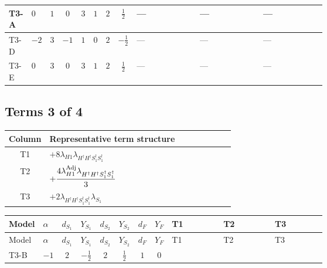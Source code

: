 \documentclass[8pt]{article}
\begin{document}
\begin{landscape}
\begin{longtable}{@{}llcccccc >{\raggedright\arraybackslash}p{0.21\linewidth} >{\raggedright\arraybackslash}p{0.21\linewidth} >{\raggedright\arraybackslash}p{0.21\linewidth}@{}}
\midrule
T3-A & $0$ & $1$ & $0$ & $3$ & $1$ & $2$ & $\frac{1}{2}$ & --- & --- & --- \\
\midrule
T3-D & $-2$ & $3$ & $-1$ & $1$ & $0$ & $2$ & $-\frac{1}{2}$ & --- & --- & --- \\
\midrule
T3-E & $0$ & $3$ & $0$ & $3$ & $1$ & $2$ & $\frac{1}{2}$ & --- & --- & --- \\
\midrule
\bottomrule
\end{longtable}
\clearpage
\subsection*{Terms 3 of 4}
\begin{center}
\begin{tabular}{@{}c >{\raggedright\arraybackslash}p{0.82\linewidth}@{}}
\toprule
Column & Representative term structure \\
\midrule
T1 & \(\displaystyle +8 {\lambda_{H1}} {\lambda_{H^\dagger H^\dagger S_1^\dagger S_1^\dagger}}\) \\
\midrule
T2 & \(\displaystyle +\frac{4 {\lambda_{H1}^{\rm Adj}} {\lambda_{H^\dagger H^\dagger S_1^\dagger S_1^\dagger}}}{3}\) \\
\midrule
T3 & \(\displaystyle +2 {\lambda_{H^\dagger H^\dagger S_1^\dagger S_1^\dagger}} {\lambda_{S_1}}\) \\
\midrule
\bottomrule
\end{tabular}
\end{center}
\smallskip
\tiny
\begin{longtable}{@{}llcccccc >{\raggedright\arraybackslash}p{0.21\linewidth} >{\raggedright\arraybackslash}p{0.21\linewidth} >{\raggedright\arraybackslash}p{0.21\linewidth}@{}}
\toprule
Model & $\alpha$ & $d_{S_1}$ & $Y_{S_1}$ & $d_{S_2}$ & $Y_{S_2}$ & $d_F$ & $Y_F$ & T1 & T2 & T3 \\
\midrule
\endfirsthead
\toprule
Model & $\alpha$ & $d_{S_1}$ & $Y_{S_1}$ & $d_{S_2}$ & $Y_{S_2}$ & $d_F$ & $Y_F$ & T1 & T2 & T3 \\
\midrule
\endhead
T3-B & $-1$ & $2$ & $-\frac{1}{2}$ & $2$ & $\frac{1}{2}$ & $1$ & $0$ & \scriptsize\adjustbox{max width=\linewidth}{$\begin{gathered} +8 {\lambda_{H1}} {\lambda_{H^\dagger H^\dagger S_1^\dagger S_1^\dagger}}\end{gathered}$} & \scriptsize\adjustbox{max width=\linewidth}{$\begin{gathered} +\frac{4 {\lambda_{H1}^{\rm Adj}} {\lambda_{H^\dagger H^\dagger S_1^\dagger S_1^\dagger}}}{3}\end{gathered}$} & \scriptsize\adjustbox{max width=\linewidth}{$\begin{gathered} +2 {\lambda_{H^\dagger H^\dagger S_1^\dagger S_1^\dagger}} {\lambda_{S_1}}\end{gathered}$} \\

\end{longtable}
\end{landscape}
\end{document}
